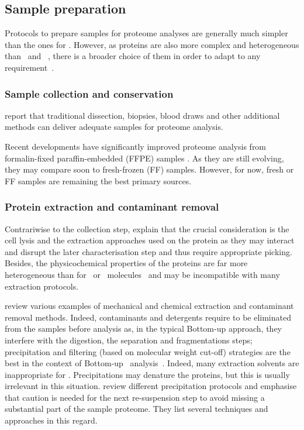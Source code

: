 \subsection{Sample preparation}\label{subsec:ProtSampPrep}
Protocols to prepare samples for proteome analyses are generally much simpler
than the ones for \Rnaseq.
However, as proteins are also more complex and heterogeneous
than \DNA\ and \RNA~, there is a broader choice of them
in order to adapt to any requirement~.

\subsubsection{Sample collection and conservation}
\citet{Feist2015} report that traditional dissection, biopsies, blood draws and
other additional methods can deliver adequate samples for proteome analysis.

Recent developments have significantly improved proteome analysis from
formalin-fixed paraffin-embedded (\gls{FFPE}) samples .
As they are still evolving,
they may compare soon to fresh-frozen (\gls{FF}) samples.
However, for now, fresh or \gls{FF} samples are remaining the best primary sources.

\subsubsection{Protein extraction and contaminant removal}
Contrariwise to the collection step, \citet{Feist2015} explain that the crucial
consideration is the cell lysis and the extraction approaches used on
the protein as they may interact and disrupt the later characterisation step and
thus require appropriate picking. Besides, the physicochemical properties of
the proteins are far more heterogeneous than for \DNA\ or \RNA\ molecules~
and may be incompatible with many extraction protocols.

\citet{Gutstein2008,Bodzon-Kulakowska2007,Visser2005,Hilbrig2003} review various
examples of mechanical and chemical extraction and contaminant removal methods.
Indeed, contaminants and detergents require to be eliminated from the samples
before analysis as, in the typical \gls{Bottom-up} approach, they interfere
with the digestion, the separation and fragmentations steps; precipitation and
filtering (based on molecular weight cut-off) strategies are the best in the
context of \gls{Bottom-up} \ms\ analysis~. Indeed, many
extraction solvents are inappropriate for \ms. Precipitations may denature the
proteins, but this is usually irrelevant in this situation.
\citet{Feist2015} review different precipitation protocols
and emphasise that caution is needed
for the next re-suspension step to avoid missing a substantial part of the
sample proteome. They list several techniques and approaches in this regard.

